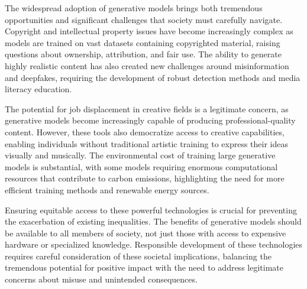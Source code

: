 The widespread adoption of generative models brings both tremendous opportunities and significant challenges that society must carefully navigate. Copyright and intellectual property issues have become increasingly complex as models are trained on vast datasets containing copyrighted material, raising questions about ownership, attribution, and fair use. The ability to generate highly realistic content has also created new challenges around misinformation and deepfakes, requiring the development of robust detection methods and media literacy education.

The potential for job displacement in creative fields is a legitimate concern, as generative models become increasingly capable of producing professional-quality content. However, these tools also democratize access to creative capabilities, enabling individuals without traditional artistic training to express their ideas visually and musically. The environmental cost of training large generative models is substantial, with some models requiring enormous computational resources that contribute to carbon emissions, highlighting the need for more efficient training methods and renewable energy sources.

Ensuring equitable access to these powerful technologies is crucial for preventing the exacerbation of existing inequalities. The benefits of generative models should be available to all members of society, not just those with access to expensive hardware or specialized knowledge. Responsible development of these technologies requires careful consideration of these societal implications, balancing the tremendous potential for positive impact with the need to address legitimate concerns about misuse and unintended consequences.






